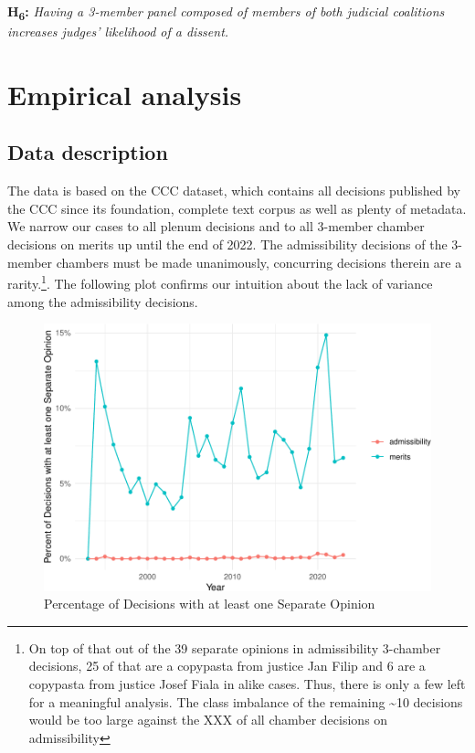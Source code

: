 \documentclass[
  11pt,
]{article}
\begin{document}
\textbf{H\textsubscript{6}:} \emph{Having a 3-member panel composed of
members of both judicial coalitions increases judges' likelihood of a
dissent.}

\hypertarget{empirical-analysis}{%
\section{Empirical analysis}\label{empirical-analysis}}

\hypertarget{data-description}{%
\subsection{Data description}\label{data-description}}

The data is based on the CCC dataset, which contains all decisions
published by the CCC since its foundation, complete text corpus as well
as plenty of metadata. We narrow our cases to all plenum decisions and
to all 3-member chamber decisions on merits up until the end of 2022.
The admissibility decisions of the 3-member chambers must be made
unanimously, concurring decisions therein are a rarity.\footnote{On top
  of that out of the 39 separate opinions in admissibility 3-chamber
  decisions, 25 of that are a copypasta from justice Jan Filip and 6 are
  a copypasta from justice Josef Fiala in alike cases. Thus, there is
  only a few left for a meaningful analysis. The class imbalance of the
  remaining \textasciitilde10 decisions would be too large against the
  XXX of all chamber decisions on admissibility}. The following plot
confirms our intuition about the lack of variance among the
admissibility decisions.

\begin{figure}
\centering
\includegraphics{separate_opinions_files/figure-latex/unnamed-chunk-1-1.pdf}
\caption{Percentage of Decisions with at least one Separate Opinion}
\end{figure}
\end{document}
